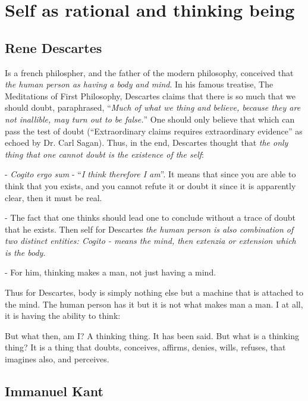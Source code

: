 \documentclass[12pt, UTF8]{article}
\begin{document}
	\section{Self as rational and thinking being}
	
	\subsection*{Rene Descartes}
	
	Is a french philospher, and the father of the modern philosophy, conceived that \emph{the human person as having a body and mind}. In his famous treatise, The Meditations of First Philosophy, Descartes claims that there is so much that we should doubt, paraphrased, ``\textit{Much of what we thing and believe, because they are not inallible, may turn out to be false.}'' One should only believe that which can pass the test of doubt (``Extraordinary claims requires extraordinary evidence'' as echoed by Dr. Carl Sagan). Thus, in the end, Descartes thought that \textit{the only thing that one cannot doubt is the existence of the self}:
	
	- \emph{Cogito ergo sum} - ``\textit{I think therefore I am}''. It means that since you are able to think that you exists, and you cannot refute it or doubt it since it is apparently clear, then it must be real.
	
	- The fact that one thinks should lead one to conclude without a trace of doubt that he exists. Then self for Descartes \emph{the human person is also combination of two distinct entities: Cogito - means the mind, then extenzia or extension which is the body}.
	
	- For him, thinking makes a man, not just having a mind.
	
	Thus for Descartes, body is simply nothing else but a machine that is attached to the mind. The human person has it but it is not what makes man a man. I at all, it is having the ability to think:
	
	\begin{displayquote}
		But what then, am I? A thinking thing. It has been said. But what is a thinking thing? It is a thing that doubts, conceives, affirms, denies, wills, refuses, that imagines also, and perceives.
	\end{displayquote}
	
	\subsection*{Immanuel Kant}
	
\end{document}
